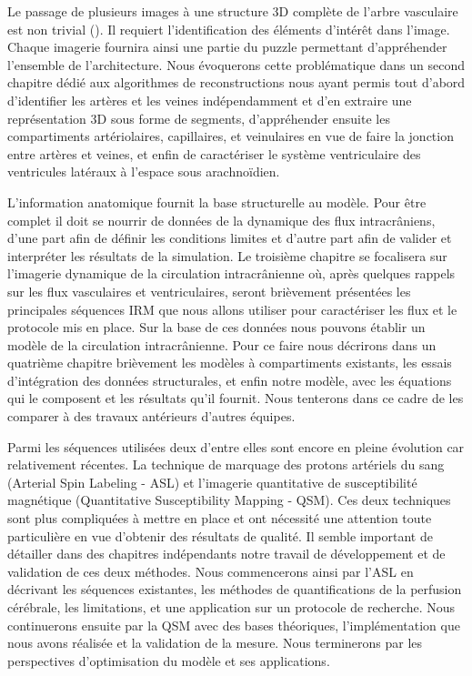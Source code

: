 Le passage de plusieurs images à une structure 3D complète de l’arbre vasculaire est non trivial (\cite{Luboz2005}). Il requiert l’identification des éléments d’intérêt dans l’image. Chaque imagerie fournira ainsi 
une partie du puzzle permettant d’appréhender l’ensemble de l’architecture. Nous évoquerons cette problématique dans un second chapitre dédié aux algorithmes de reconstructions nous ayant permis tout 
d’abord d’identifier les artères et les veines indépendamment et d’en extraire une représentation 3D sous forme de segments, d’appréhender ensuite les compartiments artériolaires, capillaires, et
veinulaires en vue de faire la jonction entre artères et veines, et enfin de caractériser le système ventriculaire des ventricules latéraux à l’espace sous arachnoïdien.

L’information anatomique fournit la base structurelle au modèle. Pour être complet il doit se nourrir de données de la dynamique des flux intracrâniens, d’une part afin de définir les conditions 
limites et d’autre part afin de valider et interpréter les résultats de la simulation. Le troisième chapitre se focalisera sur l’imagerie dynamique de la circulation intracrânienne où, après quelques 
rappels sur les flux vasculaires et ventriculaires, seront brièvement présentées les principales séquences IRM que nous allons utiliser pour caractériser les flux et le protocole mis en place.
Sur la base de ces données nous pouvons établir un modèle de la circulation intracrânienne. Pour ce faire nous décrirons dans un quatrième chapitre brièvement les modèles à compartiments existants, 
les essais d’intégration des données structurales, et enfin notre modèle, avec les équations qui le composent et les résultats qu’il fournit. Nous tenterons dans ce cadre de les comparer à des travaux 
antérieurs d’autres équipes.

Parmi les séquences utilisées deux d’entre elles sont encore en pleine évolution car relativement récentes. La technique de marquage des protons artériels du sang (Arterial Spin Labeling - ASL) et l’imagerie 
quantitative de susceptibilité magnétique (Quantitative Susceptibility Mapping - QSM). Ces deux techniques sont plus compliquées à mettre en place et ont nécessité une attention toute particulière en vue d’obtenir des résultats de qualité. 
Il semble important de détailler dans des chapitres indépendants notre travail de développement et de validation de ces deux méthodes. Nous commencerons ainsi par l’ASL en décrivant 
les séquences existantes, les méthodes de quantifications de la perfusion cérébrale, les limitations, et une application sur un protocole de recherche. Nous continuerons ensuite par la QSM avec des bases théoriques, l’implémentation que nous avons réalisée et la validation de la mesure.
Nous terminerons par les perspectives d’optimisation du modèle et ses applications.\\

		
{}

